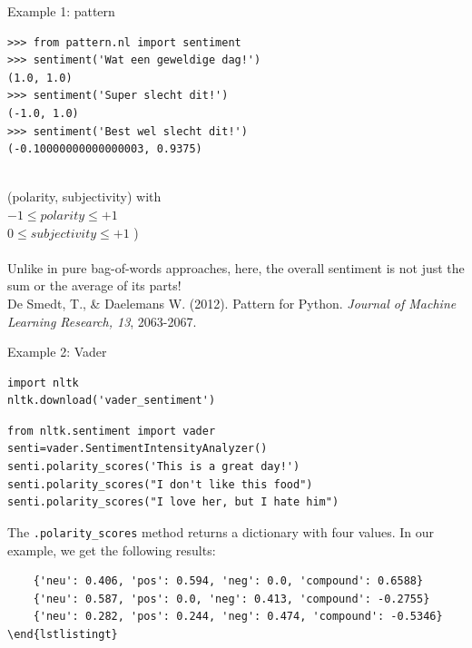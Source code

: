 \documentclass{beamer}
\begin{document}
\begin{frame}[fragile]{Example 1: pattern}
\begin{lstlisting}
>>> from pattern.nl import sentiment
>>> sentiment('Wat een geweldige dag!')
(1.0, 1.0)
>>> sentiment('Super slecht dit!')
(-1.0, 1.0)
>>> sentiment('Best wel slecht dit!')
(-0.10000000000000003, 0.9375)
\end{lstlisting}
~\\
\footnotesize{(polarity, subjectivity) with \\
	$-1 \leq polarity \leq +1$\\
	$0 \leq subjectivity \leq +1$ )\\} ~ \\
Unlike in pure bag-of-words approaches, here, the overall sentiment is not just the sum or the average of its parts! \\
\tiny{De Smedt, T., \& Daelemans W. (2012).  Pattern for Python. \emph{Journal of Machine Learning Research, 13}, 2063-2067.}
\end{frame}



\begin{frame}[fragile]{Example 2: Vader}
\begin{lstlisting}
import nltk
nltk.download('vader_sentiment')
\end{lstlisting}

\begin{lstlisting}
from nltk.sentiment import vader
senti=vader.SentimentIntensityAnalyzer()
senti.polarity_scores('This is a great day!')
senti.polarity_scores("I don't like this food")
senti.polarity_scores("I love her, but I hate him")
\end{lstlisting}

The \texttt{.polarity\_scores} method returns a dictionary with four values. In our example, we get the following results:

\begin{lstlisting}
	{'neu': 0.406, 'pos': 0.594, 'neg': 0.0, 'compound': 0.6588}
	{'neu': 0.587, 'pos': 0.0, 'neg': 0.413, 'compound': -0.2755}
	{'neu': 0.282, 'pos': 0.244, 'neg': 0.474, 'compound': -0.5346}
\end{lstlistingt}
	\end{lstlisting}
\end{frame}
\end{document}
